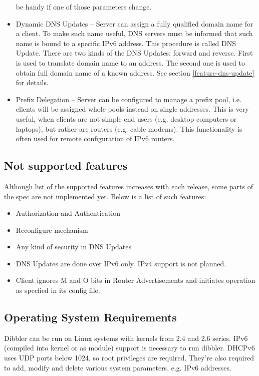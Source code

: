 \begin{itemize}
      be handy if one of those parameters change. \cite{rfc4242}
\item Dynamic DNS Updates -- Server can assign a fully qualified
      domain name for a client. To make such name useful, DNS servers
      must be informed that such name is bound to a specific IPv6
      address. This procedure is called DNS Update. There are two kinds
      of the DNS Updates: forward and reverse. First is used to
      translate domain name to an address. The second one is used to
      obtain full domain name of a known address. See section
      \ref{feature-dns-update} for details. \cite{rfc4704}
\item Prefix Delegation -- Server can be configured to manage a prefix
      pool, i.e. clients will be assigned whole pools instead on
      single addresses. This is very useful, when clients are not
      simple end users (e.g. desktop computers or laptops), but rather
      are routers (e.g. cable modems). This functionality is often
      used for remote configuration of IPv6 routers. \cite{rfc3633}
\end{itemize}

\subsection{Not supported features}
Although list of the supported features increases with each release,
some parts of the spec are not implemented yet. Below is a list of such
features:

\begin{itemize}
 \item Authorization and Authentication\cite{rfc3315}
 \item Reconfigure mechanism\cite{rfc3315}
 \item Any kind of security in DNS Updates\cite{rfc4704}
 \item DNS Updates are done over IPv6 only. IPv4 support is not
   planned.
 \item Client ignores M and O bits in Router Advertisements and
   initiates operation as specfied in its config file.
\end{itemize}

\subsection{Operating System Requirements}
\label{requirements}
Dibbler can be run on Linux systems with kernels from 2.4 and 2.6
series. IPv6 (compiled into kernel or as module) support is necessary
to run dibbler. DHCPv6 uses UDP ports below 1024, so root privileges
are required. They're also required to add, modify and delete various
system parameters, e.g. IPv6 addresses.

